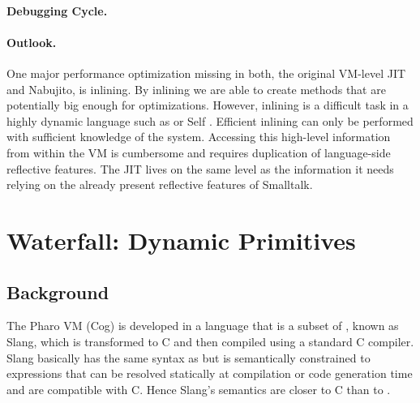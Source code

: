 \paragraph{Debugging Cycle.}

\paragraph{Outlook.}
One major performance optimization missing in both, the original \PH VM-level JIT and Nabujito, is inlining. 
By inlining we are able to create methods that are potentially big enough for optimizations.
However, inlining is a difficult task in a highly dynamic language such as \ST or Self \cite{Cham89a}. 
Efficient inlining can only be performed with sufficient knowledge of the system. 
Accessing this high-level information from within the VM is cumbersome and requires duplication of language-side reflective features.
The JIT lives on the same level as the information it needs relying on the already present reflective features of Smalltalk.


\section{Waterfall: Dynamic Primitives}


\subsection{Background}

The Pharo VM (Cog) is developed in a language that is a subset of \ST, known as Slang, which is transformed to C and then compiled using a standard C compiler.  
Slang basically has the same syntax as \ST but is semantically constrained to expressions that can be resolved statically at compilation or code generation time and are compatible with C.
Hence Slang's semantics are closer to C than to \ST. 

